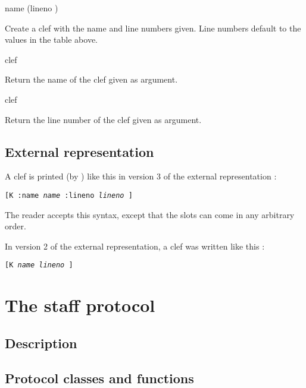 


 {name \optional (lineno )}

Create a clef with the name and line numbers given.  Line numbers
default to the values in the table above. 

 {clef}

Return the name of the clef given as argument.

 {clef}

Return the line number of the clef given as argument. 

\subsection{External representation}

A clef is printed (by ) like this in version 3
of the external representation :

\texttt{[K :name \textit{name} :lineno \textit{lineno} ]}

The reader accepts this syntax, except that the slots can come in any
arbitrary order. 

In version 2 of the external representation, a clef was written like
this :

\texttt{[K \textit{name} \textit{lineno} ]}

\section{The staff protocol}

\subsection{Description}

\subsection{Protocol classes and functions}



